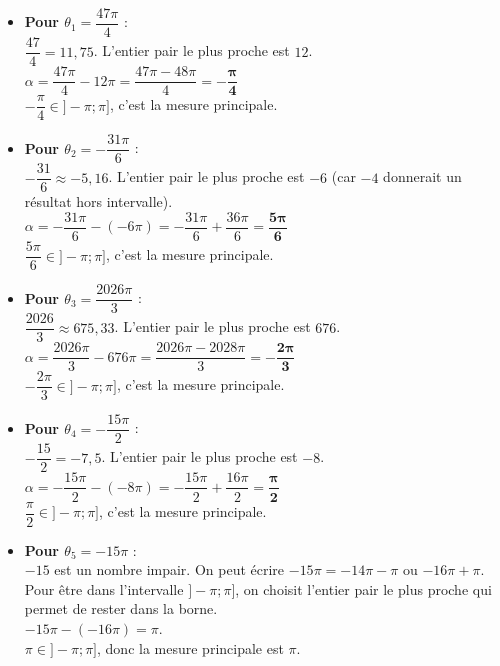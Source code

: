 \documentclass[12pt,a4paper]{article}
\begin{document}
\begin{itemize}
    \item[a)] \textbf{Pour $\theta_1 = \dfrac{47\pi}{4}$} :
    \\ $\dfrac{47}{4} = 11,75$. L'entier pair le plus proche est $12$.
    \\ $\alpha = \dfrac{47\pi}{4} - 12\pi = \dfrac{47\pi - 48\pi}{4} = \mathbf{-\dfrac{\pi}{4}}$
    \\ $-\dfrac{\pi}{4} \in ]-\pi ; \pi]$, c'est la mesure principale.

    \vspace{1em}

    \item[b)] \textbf{Pour $\theta_2 = -\dfrac{31\pi}{6}$} :
    \\ $-\dfrac{31}{6} \approx -5,16$. L'entier pair le plus proche est $-6$ (car $-4$ donnerait un résultat hors intervalle).
    \\ $\alpha = -\dfrac{31\pi}{6} - (-6\pi) = -\dfrac{31\pi}{6} + \dfrac{36\pi}{6} = \mathbf{\dfrac{5\pi}{6}}$
    \\ $\dfrac{5\pi}{6} \in ]-\pi ; \pi]$, c'est la mesure principale.

    \vspace{1em}

    \item[c)] \textbf{Pour $\theta_3 = \dfrac{2026\pi}{3}$} :
    \\ $\dfrac{2026}{3} \approx 675,33$. L'entier pair le plus proche est $676$.
    \\ $\alpha = \dfrac{2026\pi}{3} - 676\pi = \dfrac{2026\pi - 2028\pi}{3} = \mathbf{-\dfrac{2\pi}{3}}$
    \\ $-\dfrac{2\pi}{3} \in ]-\pi ; \pi]$, c'est la mesure principale.

    \vspace{1em}

    \item[d)] \textbf{Pour $\theta_4 = -\dfrac{15\pi}{2}$} :
    \\ $-\dfrac{15}{2} = -7,5$. L'entier pair le plus proche est $-8$.
    \\ $\alpha = -\dfrac{15\pi}{2} - (-8\pi) = -\dfrac{15\pi}{2} + \dfrac{16\pi}{2} = \mathbf{\dfrac{\pi}{2}}$
    \\ $\dfrac{\pi}{2} \in ]-\pi ; \pi]$, c'est la mesure principale.
    \item[e)] \textbf{Pour $\theta_5 = -15\pi$} :
    \\ $-15$ est un nombre impair. On peut écrire $-15\pi = -14\pi - \pi$ ou $-16\pi + \pi$.
    \\ Pour être dans l'intervalle $]-\pi ; \pi]$, on choisit l'entier pair le plus proche qui permet de rester dans la borne.
    \\ $-15\pi - (-16\pi) = \pi$.
    \\ $\pi \in ]-\pi ; \pi]$, donc la mesure principale est \textbf{$\pi$}.
    

\end{itemize}
\end{document}
